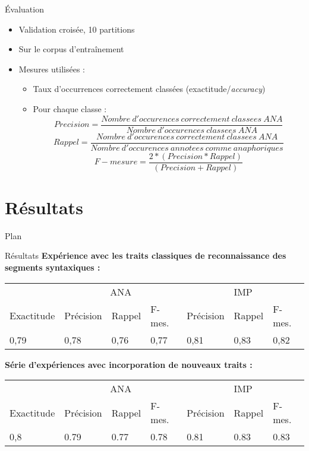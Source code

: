 \documentclass{beamer}
\begin{document}
\begin{frame}{Évaluation}
\begin{itemize}
  \item Validation croisée, 10 partitions
  \item Sur le corpus d'entraînement
  \item Mesures utilisées :
  \begin{itemize}
    \item Taux d'occurrences correctement classées (exactitude/\textit{accuracy})
    \item Pour chaque classe :
\[Precision = \frac{Nombre\ d'occurences\ correctement\ classees\ ANA}{Nombre\ d'occurences\ classees\ ANA}\]
\[Rappel = \frac{Nombre\ d'occurences\ correctement\ classees\ ANA}{Nombre\ d'occurences\ annotees\ comme\ anaphoriques}\]
\[F-mesure = \frac{2 * (Precision * Rappel)}{(Precision + Rappel)}\]
  \end{itemize}
\end{itemize}
\end{frame}


\section{Résultats}

\begin{frame}{Plan}
  \tableofcontents[currentsection]
\end{frame}

\begin{frame}{Résultats}
\textbf{Expérience avec les traits classiques de reconnaissance des segments syntaxiques :}

\begin{tabular}[H]{l|lll|lll}
& \multicolumn{3}{c|}{ANA} & \multicolumn{3}{c}{IMP}\\
Exactitude & Précision & Rappel & F-mes. & Précision & Rappel & F-mes.\\
\hline
0,79 & 0,78 & 0,76 & 0,77 & 0,81 & 0,83 & 0,82\\
\hline
\end{tabular}

\vskip 1cm
\textbf{Série d'expériences avec incorporation de nouveaux traits :}

\begin{tabular}[H]{l|lll|lll}
& \multicolumn{3}{c|}{ANA} & \multicolumn{3}{c}{IMP}\\
Exactitude & Précision & Rappel & F-mes. & Précision & Rappel & F-mes.\\
\hline
0,8 & 0.79 & 0.77 & 0.78 & 0.81 & 0.83 & 0.83\\
\hline
\end{tabular}
\end{frame}
\end{document}
